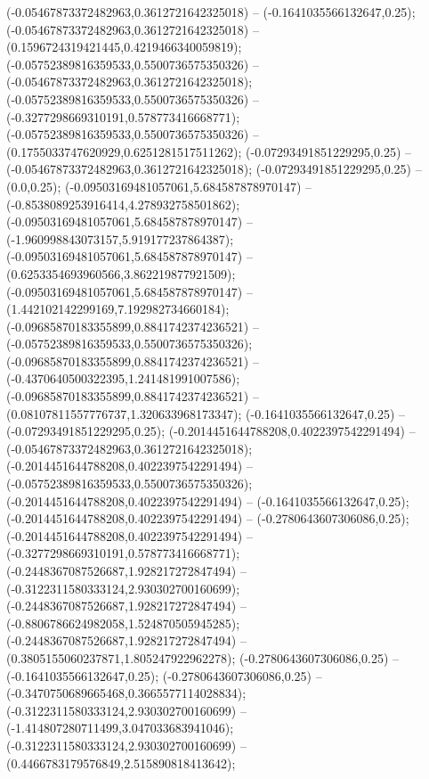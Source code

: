  (-0.05467873372482963,0.3612721642325018) -- (-0.1641035566132647,0.25);
 (-0.05467873372482963,0.3612721642325018) -- (0.1596724319421445,0.4219466340059819);
 (-0.05752389816359533,0.5500736575350326) -- (-0.05467873372482963,0.3612721642325018);
 (-0.05752389816359533,0.5500736575350326) -- (-0.3277298669310191,0.578773416668771);
 (-0.05752389816359533,0.5500736575350326) -- (0.1755033747620929,0.6251281517511262);
 (-0.07293491851229295,0.25) -- (-0.05467873372482963,0.3612721642325018);
 (-0.07293491851229295,0.25) -- (0.0,0.25);
 (-0.09503169481057061,5.684587878970147) -- (-0.8538089253916414,4.278932758501862);
 (-0.09503169481057061,5.684587878970147) -- (-1.960998843073157,5.919177237864387);
 (-0.09503169481057061,5.684587878970147) -- (0.6253354693960566,3.862219877921509);
 (-0.09503169481057061,5.684587878970147) -- (1.442102142299169,7.192982734660184);
 (-0.09685870183355899,0.8841742374236521) -- (-0.05752389816359533,0.5500736575350326);
 (-0.09685870183355899,0.8841742374236521) -- (-0.4370640500322395,1.241481991007586);
 (-0.09685870183355899,0.8841742374236521) -- (0.08107811557776737,1.320633968173347);
 (-0.1641035566132647,0.25) -- (-0.07293491851229295,0.25);
 (-0.2014451644788208,0.4022397542291494) -- (-0.05467873372482963,0.3612721642325018);
 (-0.2014451644788208,0.4022397542291494) -- (-0.05752389816359533,0.5500736575350326);
 (-0.2014451644788208,0.4022397542291494) -- (-0.1641035566132647,0.25);
 (-0.2014451644788208,0.4022397542291494) -- (-0.2780643607306086,0.25);
 (-0.2014451644788208,0.4022397542291494) -- (-0.3277298669310191,0.578773416668771);
 (-0.2448367087526687,1.928217272847494) -- (-0.3122311580333124,2.930302700160699);
 (-0.2448367087526687,1.928217272847494) -- (-0.8806786624982058,1.524870505945285);
 (-0.2448367087526687,1.928217272847494) -- (0.3805155060237871,1.805247922962278);
 (-0.2780643607306086,0.25) -- (-0.1641035566132647,0.25);
 (-0.2780643607306086,0.25) -- (-0.3470750689665468,0.3665577114028834);
 (-0.3122311580333124,2.930302700160699) -- (-1.414807280711499,3.047033683941046);
 (-0.3122311580333124,2.930302700160699) -- (0.4466783179576849,2.515890818413642);
